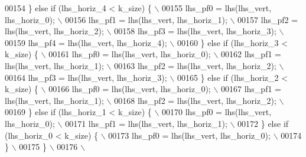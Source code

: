 \begin{DoxyCode}
00154 \textcolor{preprocessor}{      \} else if (lhs\_horiz\_4 < k\_size) \{                        \(\backslash\)}
00155 \textcolor{preprocessor}{        lhs\_pf0 = lhs(lhs\_vert, lhs\_horiz\_0);                   \(\backslash\)}
00156 \textcolor{preprocessor}{        lhs\_pf1 = lhs(lhs\_vert, lhs\_horiz\_1);                   \(\backslash\)}
00157 \textcolor{preprocessor}{        lhs\_pf2 = lhs(lhs\_vert, lhs\_horiz\_2);                   \(\backslash\)}
00158 \textcolor{preprocessor}{        lhs\_pf3 = lhs(lhs\_vert, lhs\_horiz\_3);                   \(\backslash\)}
00159 \textcolor{preprocessor}{        lhs\_pf4 = lhs(lhs\_vert, lhs\_horiz\_4);                   \(\backslash\)}
00160 \textcolor{preprocessor}{      \} else if (lhs\_horiz\_3 < k\_size) \{                        \(\backslash\)}
00161 \textcolor{preprocessor}{        lhs\_pf0 = lhs(lhs\_vert, lhs\_horiz\_0);                   \(\backslash\)}
00162 \textcolor{preprocessor}{        lhs\_pf1 = lhs(lhs\_vert, lhs\_horiz\_1);                   \(\backslash\)}
00163 \textcolor{preprocessor}{        lhs\_pf2 = lhs(lhs\_vert, lhs\_horiz\_2);                   \(\backslash\)}
00164 \textcolor{preprocessor}{        lhs\_pf3 = lhs(lhs\_vert, lhs\_horiz\_3);                   \(\backslash\)}
00165 \textcolor{preprocessor}{      \} else if (lhs\_horiz\_2 < k\_size) \{                        \(\backslash\)}
00166 \textcolor{preprocessor}{        lhs\_pf0 = lhs(lhs\_vert, lhs\_horiz\_0);                   \(\backslash\)}
00167 \textcolor{preprocessor}{        lhs\_pf1 = lhs(lhs\_vert, lhs\_horiz\_1);                   \(\backslash\)}
00168 \textcolor{preprocessor}{        lhs\_pf2 = lhs(lhs\_vert, lhs\_horiz\_2);                   \(\backslash\)}
00169 \textcolor{preprocessor}{      \} else if (lhs\_horiz\_1 < k\_size) \{                        \(\backslash\)}
00170 \textcolor{preprocessor}{        lhs\_pf0 = lhs(lhs\_vert, lhs\_horiz\_0);                   \(\backslash\)}
00171 \textcolor{preprocessor}{        lhs\_pf1 = lhs(lhs\_vert, lhs\_horiz\_1);                   \(\backslash\)}
00172 \textcolor{preprocessor}{      \} else if (lhs\_horiz\_0 < k\_size) \{                        \(\backslash\)}
00173 \textcolor{preprocessor}{        lhs\_pf0 = lhs(lhs\_vert, lhs\_horiz\_0);                   \(\backslash\)}
00174 \textcolor{preprocessor}{      \}                                                         \(\backslash\)}
00175 \textcolor{preprocessor}{    \}                                                           \(\backslash\)}
00176 \textcolor{preprocessor}{                                                                \(\backslash\)}

\end{DoxyCode}
